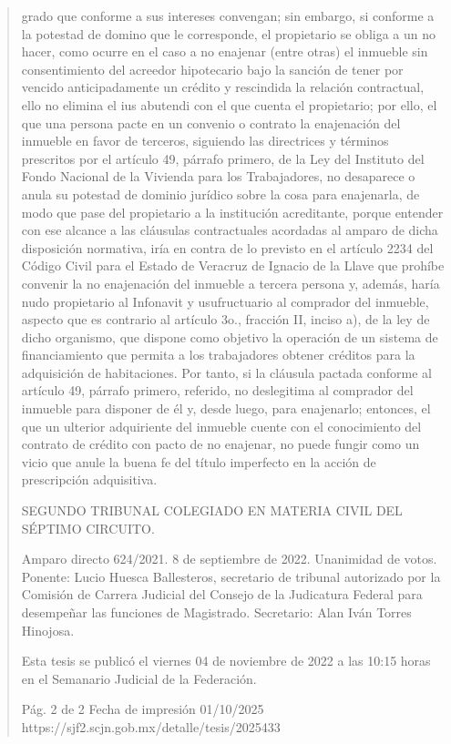 \documentclass[11pt,a4paper]{article}
\begin{document}
\begin{quote}
grado que conforme a sus intereses convengan; sin embargo, si conforme a la potestad de domino
que le corresponde, el propietario se obliga a un no hacer, como ocurre en el caso a no enajenar
(entre otras) el inmueble sin consentimiento del acreedor hipotecario bajo la sanción de tener por
vencido anticipadamente un crédito y rescindida la relación contractual, ello no elimina el ius
abutendi con el que cuenta el propietario; por ello, el que una persona pacte en un convenio o
contrato la enajenación del inmueble en favor de terceros, siguiendo las directrices y términos
prescritos por el artículo 49, párrafo primero, de la Ley del Instituto del Fondo Nacional de la
Vivienda para los Trabajadores, no desaparece o anula su potestad de dominio jurídico sobre la
cosa para enajenarla, de modo que pase del propietario a la institución acreditante, porque entender
con ese alcance a las cláusulas contractuales acordadas al amparo de dicha disposición normativa,
iría en contra de lo previsto en el artículo 2234 del Código Civil para el Estado de Veracruz de
Ignacio de la Llave que prohíbe convenir la no enajenación del inmueble a tercera persona y,
además, haría nudo propietario al Infonavit y usufructuario al comprador del inmueble, aspecto que
es contrario al artículo 3o., fracción II, inciso a), de la ley de dicho organismo, que dispone como
objetivo la operación de un sistema de financiamiento que permita a los trabajadores obtener
créditos para la adquisición de habitaciones. Por tanto, si la cláusula pactada conforme al artículo
49, párrafo primero, referido, no deslegitima al comprador del inmueble para disponer de él y, desde
luego, para enajenarlo; entonces, el que un ulterior adquiriente del inmueble cuente con el
conocimiento del contrato de crédito con pacto de no enajenar, no puede fungir como un vicio que
anule la buena fe del título imperfecto en la acción de prescripción adquisitiva.

SEGUNDO TRIBUNAL COLEGIADO EN MATERIA CIVIL DEL SÉPTIMO CIRCUITO.


Amparo directo 624/2021. 8 de septiembre de 2022. Unanimidad de votos. Ponente: Lucio Huesca
Ballesteros, secretario de tribunal autorizado por la Comisión de Carrera Judicial del Consejo de la
Judicatura Federal para desempeñar las funciones de Magistrado. Secretario: Alan Iván Torres
Hinojosa.


Esta tesis se publicó el viernes 04 de noviembre de 2022 a las 10:15 horas en el Semanario Judicial
de la Federación.




                                             Pág. 2 de 2            Fecha de impresión 01/10/2025
 https://sjf2.scjn.gob.mx/detalle/tesis/2025433

\end{quote}
\end{document}
